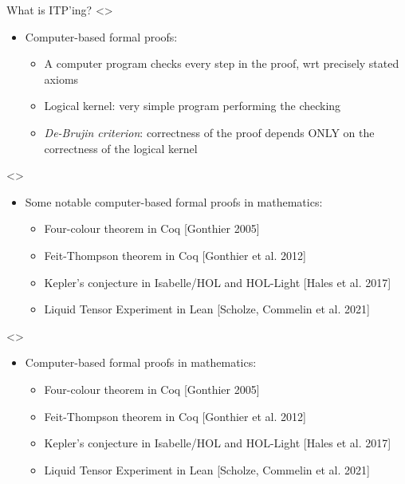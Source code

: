 \documentclass[compress,10pt,xcolor=dvipsnames]{beamer}
\begin{document}
\begin{frame}{What is ITP'ing?}
\only<\computerbasedformalproofs>{
\begin{itemize}
  \item Computer-based formal proofs:
    \begin{itemize}
    \item A computer program checks every step in the proof, wrt precisely stated axioms
    \item Logical kernel: very simple program performing the checking
    \item \emph{De-Brujin criterion}: correctness of the proof depends ONLY on the correctness of the logical kernel
    \end{itemize}
\end{itemize}
}

\note<\computerbasedformalproofseg>{
\tiny
  \begin{itemize}
  \item Some notable computer-based formal proofs in mathematics:
    \begin{itemize}
      \item Four-colour theorem in Coq [Gonthier 2005]
      \item Feit-Thompson theorem in Coq [Gonthier et al. 2012]
      \item Kepler's conjecture in Isabelle/HOL and HOL-Light [Hales et al. 2017]
      \item Liquid Tensor Experiment in Lean [Scholze, Commelin et al. 2021]
    \end{itemize}
  \end{itemize}
}

\only<\computerbasedformalproofseg>{
\begin{itemize}
  \item Computer-based formal proofs in mathematics:
    \begin{itemize}
      \item Four-colour theorem in Coq [Gonthier 2005]
      \item Feit-Thompson theorem in Coq [Gonthier et al. 2012]
      \item Kepler's conjecture in Isabelle/HOL and HOL-Light [Hales et al. 2017]
      \item Liquid Tensor Experiment in Lean [Scholze, Commelin et al. 2021]
    \end{itemize}
\end{itemize}
}


\end{frame}
\end{document}

